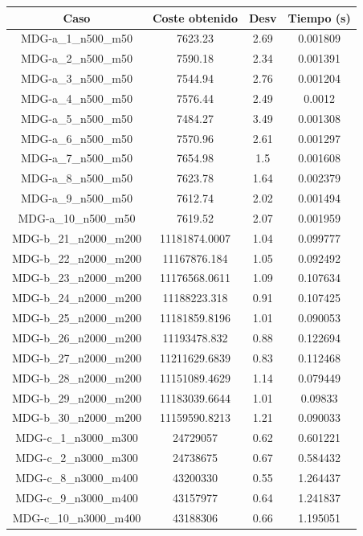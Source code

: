 \documentclass{article}
\begin{document}
\begin{table}[H]
	\centering
	\begin{tabular}{|cccc|}
		\hline
		Caso & Coste obtenido & Desv & Tiempo (s)\\ \hline
		MDG-a\_1\_n500\_m50 & 7623.23 & 2.69 & 0.001809\\
		MDG-a\_2\_n500\_m50 & 7590.18 & 2.34 & 0.001391\\
		MDG-a\_3\_n500\_m50 & 7544.94 & 2.76 & 0.001204\\
		MDG-a\_4\_n500\_m50 & 7576.44 & 2.49 & 0.0012\\
		MDG-a\_5\_n500\_m50 & 7484.27 & 3.49 & 0.001308\\
		MDG-a\_6\_n500\_m50 & 7570.96 & 2.61 & 0.001297\\
		MDG-a\_7\_n500\_m50 & 7654.98 & 1.5 & 0.001608\\
		MDG-a\_8\_n500\_m50 & 7623.78 & 1.64 & 0.002379\\
		MDG-a\_9\_n500\_m50 & 7612.74 & 2.02 & 0.001494\\
		MDG-a\_10\_n500\_m50 & 7619.52 & 2.07 & 0.001959\\
		MDG-b\_21\_n2000\_m200 & 11181874.0007 & 1.04 & 0.099777\\
		MDG-b\_22\_n2000\_m200 & 11167876.184 & 1.05 & 0.092492\\
		MDG-b\_23\_n2000\_m200 & 11176568.0611 & 1.09 & 0.107634\\
		MDG-b\_24\_n2000\_m200 & 11188223.318 & 0.91 & 0.107425\\
		MDG-b\_25\_n2000\_m200 & 11181859.8196 & 1.01 & 0.090053\\
		MDG-b\_26\_n2000\_m200 & 11193478.832 & 0.88 & 0.122694\\
		MDG-b\_27\_n2000\_m200 & 11211629.6839 & 0.83 & 0.112468\\
		MDG-b\_28\_n2000\_m200 & 11151089.4629 & 1.14 & 0.079449\\
		MDG-b\_29\_n2000\_m200 & 11183039.6644 & 1.01 & 0.09833\\
		MDG-b\_30\_n2000\_m200 & 11159590.8213 & 1.21 & 0.090033\\
		MDG-c\_1\_n3000\_m300 & 24729057 & 0.62 & 0.601221\\
		MDG-c\_2\_n3000\_m300 & 24738675 & 0.67 & 0.584432\\
		MDG-c\_8\_n3000\_m400 & 43200330 & 0.55 & 1.264437\\
		MDG-c\_9\_n3000\_m400 & 43157977 & 0.64 & 1.241837\\
		MDG-c\_10\_n3000\_m400 & 43188306 & 0.66 & 1.195051\\

\end{tabular}
\end{table}
\end{document}
